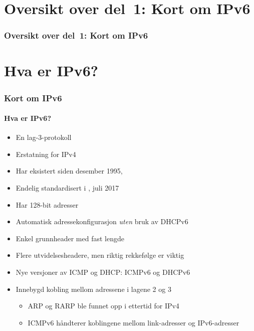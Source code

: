 \makeatletter
{}
\makeatother

\begin{frame}
  \partpage
\end{frame}

\section*{Oversikt over del~1: Kort om IPv6}
\begin{frame}
  \frametitle{Oversikt over del~1: Kort om IPv6}
    \tableofcontents
\end{frame}

\section{Hva er IPv6?}
\begin{frame}
  \frametitle{Kort om IPv6}
  \framesubtitle{Hva er IPv6?}
  \begin{itemize}
  \item En lag-3-protokoll
  \item Erstatning for IPv4
  \item Har eksistert siden desember 1995, 
  \item Endelig standardisert i , juli 2017
  \item \alert<2>{Har 128-bit adresser}
  \item \alert<2>{Automatisk adressekonfigurasjon \textit{uten\/} bruk av DHCPv6}
  \item Enkel grunnheader med fast lengde
  \item Flere utvidelsesheadere, men riktig rekkefølge er viktig
  \item Nye versjoner av ICMP og DHCP: ICMPv6 og DHCPv6
  \item Innebygd kobling mellom adressene i lagene 2 og 3
    \begin{itemize}
      \item ARP og RARP ble funnet opp i ettertid for IPv4
      \item ICMPv6 håndterer koblingene mellom link-adresser og IPv6-adresser
    \end{itemize}
  \end{itemize}
\end{frame}

